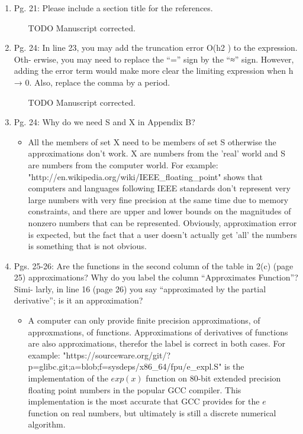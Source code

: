\documentclass{article}
\begin{document}
\begin{enumerate}
 \item
    Pg. 21: Please include a section title for the references.

{\color{red}  
\begin{itemize}
     \item
         [TODO]
         Manuscript corrected.
  \end{itemize}}

 \item
    Pg. 24: In line 23, you may add the truncation error O(h2 ) to the expression. Oth-
    erwise, you may need to replace the “=” sign by the “≈” sign. However, adding
    the error term would make more clear the limiting expression when h → 0. Also,
    replace the comma by a period.

{\color{red}  
\begin{itemize}
     \item
         [TODO]
         Manuscript corrected.
  \end{itemize}}

\item    
Pg. 24: Why do we need S and X in Appendix B?

{\color{red}  
\begin{itemize}
     \item
     All the members of set X need to be members of set S otherwise the approximations don't work. X are numbers from the 'real' world and S are numbers from the computer world. For example: "http://en.wikipedia.org/wiki/IEEE_floating_point" shows that computers and languages following IEEE standards don't represent very large numbers with very fine precision at the same time due to memory constraints, and there are upper and lower bounds on the magnitudes of nonzero numbers that can be represented. Obviously, approximation error is expected, but the fact that a user doesn't actually get 'all' the numbers is something that is not obvious.
  \end{itemize}}


\item
    Pgs. 25-26: Are the functions in the second column of the table in 2(c) (page 25)
    approximations? Why do you label the column “Approximates Function”? Simi-
    larly, in line 16 (page 26) you say “approximated by the partial derivative”; is it an
    approximation?

{\color{red}  
\begin{itemize}
     \item
      A computer can only provide finite precision approximations, of approxmations, of functions. Approximations of derivatives of functions are also approximations, therefor the label is correct in both cases. For example: "https://sourceware.org/git/?p=glibc.git;a=blob;f=sysdeps/x86_64/fpu/e_expl.S" is the implementation of the $exp(x)$ function on 80-bit extended precision floating point numbers in the popular GCC compiler. This implementation is the most accurate that GCC provides for the $e$ function on real numbers, but ultimately is still a discrete numerical algorithm.
  \end{itemize}}


\end{enumerate}
\end{document}
